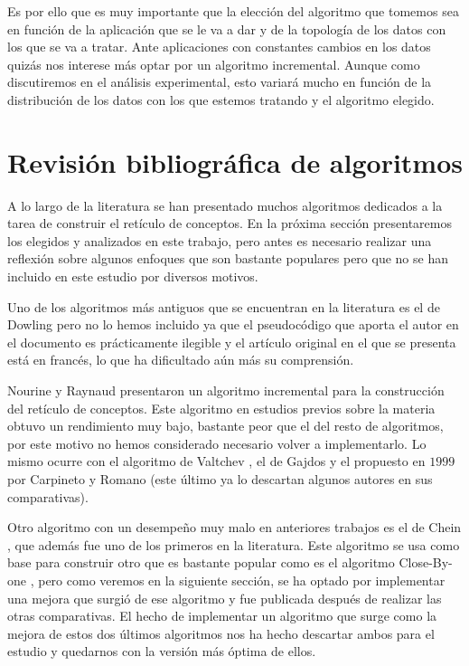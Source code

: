 \documentclass[oneside,openright,titlepage,numbers=noenddot,openany,headinclude,footinclude=true,
cleardoublepage=empty,abstractoff,BCOR=5mm,paper=a4,fontsize=12pt,main=spanish]{scrreprt}
\begin{document}
Es por ello que es muy importante que la elección del algoritmo que tomemos sea en función de la aplicación que se le va a dar y de la topología de los datos con los que se va a tratar. Ante aplicaciones con constantes cambios en los datos quizás nos interese más optar por un algoritmo incremental. Aunque como discutiremos en el análisis experimental, esto variará mucho en función de la distribución de los datos con los que estemos tratando y el algoritmo elegido.


\section{Revisión bibliográfica de algoritmos}

A lo largo de la literatura se han presentado muchos algoritmos dedicados a la tarea de construir el retículo de conceptos. En la próxima sección presentaremos los elegidos y analizados en este trabajo, pero antes es necesario realizar una reflexión sobre algunos enfoques que son bastante populares pero que no se han incluido en este estudio por diversos motivos.

Uno de los algoritmos más antiguos que se encuentran en la literatura es el de Dowling \cite{dowling_irredundant_1993} pero no lo hemos incluido ya que el pseudocódigo que aporta el autor en el documento es prácticamente ilegible y el artículo original en el que se presenta está en francés, lo que ha dificultado aún más su comprensión.

Nourine y Raynaud \cite{nourine} presentaron un algoritmo incremental para la construcción del retículo de conceptos. Este algoritmo en estudios previos sobre la materia obtuvo un rendimiento muy bajo, bastante peor que el del resto de algoritmos, por este motivo no hemos considerado necesario volver a implementarlo. Lo mismo ocurre con el algoritmo de Valtchev \cite{valtchev_partition-based_2002}, el de Gajdos \cite{gajdos_new_nodate} y el propuesto en $1999$ por Carpineto y Romano \cite{carpineto_lattice_1996} (este último ya lo descartan algunos autores en sus comparativas).

Otro algoritmo con un desempeño muy malo en anteriores trabajos es el de Chein \cite{chein}, que además fue uno de los primeros en la literatura. Este algoritmo se usa como base para construir otro que es bastante popular como es el algoritmo Close-By-one \cite{close-by-one}, pero como veremos en la siguiente sección, se ha optado por implementar una mejora que surgió de ese algoritmo y fue publicada después de realizar las otras comparativas. El hecho de implementar un algoritmo que surge como la mejora de estos dos últimos algoritmos nos ha hecho descartar ambos para el estudio y quedarnos con la versión más óptima de ellos. 
\end{document}

